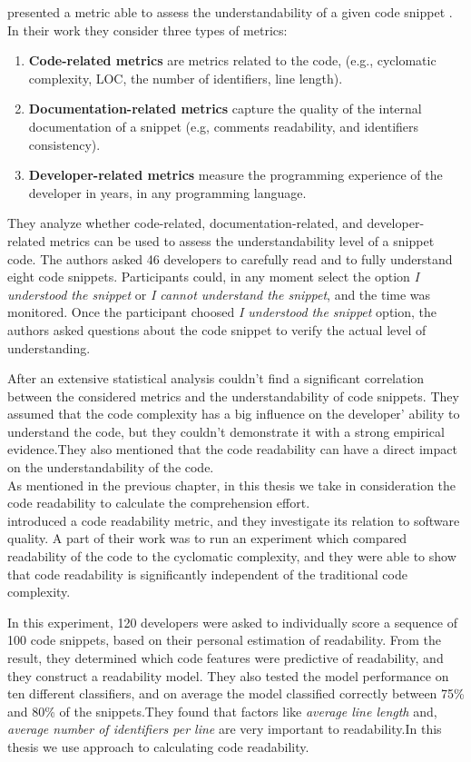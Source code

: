\documentclass[12pt,mscthesis]{usiinfthesis}
\begin{document}
	\citet{Scalabrino} presented a metric able to assess the understandability of a given code snippet . In their work they consider three types of metrics:
	\begin{enumerate}
		\item \textbf{Code-related metrics} are metrics related to the code, (e.g., cyclomatic complexity, LOC, the number of identifiers, line length).
		\item \textbf{Documentation-related metrics} capture the quality of the internal documentation of a snippet (e.g, comments readability, and identifiers consistency). 
		\item \textbf{Developer-related metrics} measure the programming experience of the developer in years, in any programming language.
	\end{enumerate}
	They analyze whether code-related, documentation-related, and developer- related metrics can be used to assess the understandability level of a snippet  code. The authors asked
	46 developers to carefully read and to fully understand eight code snippets. Participants could, in any moment select the option \textit{I understood the snippet} or \textit{I cannot understand the snippet}, and the time was monitored.
	Once the participant choosed \textit{I understood the snippet} option, the authors asked questions about the code snippet to verify the actual level of understanding.

	After an extensive statistical analysis \citet{Scalabrino} couldn't find a significant correlation between the considered metrics and the understandability of code snippets.
	They assumed that the code complexity has a big influence on the developer' ability to understand the code, but they couldn't demonstrate it with a strong empirical evidence.They also mentioned that the code readability can have a direct impact on the understandability of the code.\\ As mentioned in the previous chapter, in this thesis we take in consideration the code readability to calculate the comprehension effort.\\

	\citet{Buse2010} introduced a code readability metric, and they investigate its relation to software quality. A part of their work was to run an experiment which compared readability of the code to the cyclomatic complexity, and they were able to show that code readability is significantly independent of the traditional code complexity.


	In this experiment, 120 developers were asked to individually score a sequence of 100 code snippets, based on their personal estimation of readability. From the result, they determined which code features were predictive of readability, and they construct a readability model. They also tested the model performance on ten different classifiers, and on average the model classified correctly between 75\% and 80\% of the snippets.They found that factors like \textit{average line length} and, \textit{average number of identifiers per line} are very important to readability.In this thesis we use \citet{Buse2010} approach to calculating code readability.
\end{document}
